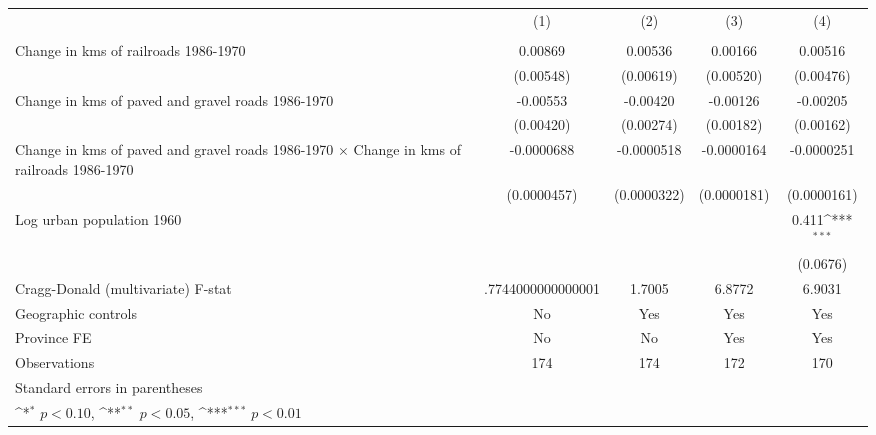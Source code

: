 {
\def\sym#1{\ifmmode^{#1}\else\(^{#1}\)\fi}
\begin{tabular}{l*{4}{c}}
\hline\hline
                &\multicolumn{1}{c}{(1)}&\multicolumn{1}{c}{(2)}&\multicolumn{1}{c}{(3)}&\multicolumn{1}{c}{(4)}\\
                &\multicolumn{1}{c}{}&\multicolumn{1}{c}{}&\multicolumn{1}{c}{}&\multicolumn{1}{c}{}\\
\hline
Change in kms of railroads 1986-1970&  0.00869         &  0.00536         &  0.00166         &  0.00516         \\
                &(0.00548)         &(0.00619)         &(0.00520)         &(0.00476)         \\
[1em]
Change in kms of paved and gravel roads 1986-1970& -0.00553         & -0.00420         & -0.00126         & -0.00205         \\
                &(0.00420)         &(0.00274)         &(0.00182)         &(0.00162)         \\
[1em]
Change in kms of paved and gravel roads 1986-1970 $\times$ Change in kms of railroads 1986-1970&-0.0000688         &-0.0000518         &-0.0000164         &-0.0000251         \\
                &(0.0000457)         &(0.0000322)         &(0.0000181)         &(0.0000161)         \\
[1em]
Log urban population 1960&                  &                  &                  &    0.411\sym{***}\\
                &                  &                  &                  & (0.0676)         \\
\hline
Cragg-Donald (multivariate) F-stat&.7744000000000001         &   1.7005         &   6.8772         &   6.9031         \\
Geographic controls&       No         &      Yes         &      Yes         &      Yes         \\
Province FE     &       No         &       No         &      Yes         &      Yes         \\
Observations    &      174         &      174         &      172         &      170         \\
\hline\hline
\multicolumn{5}{l}{\footnotesize Standard errors in parentheses}\\
\multicolumn{5}{l}{\footnotesize \sym{*} \(p<0.10\), \sym{**} \(p<0.05\), \sym{***} \(p<0.01\)}\\
\end{tabular}
}
